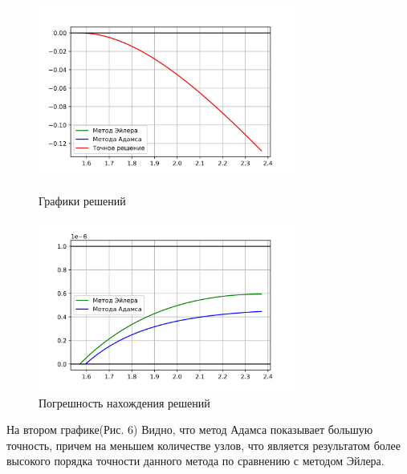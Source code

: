 \begin{figure}[h!]
	\centering                                                                                            
	\begin{minipage}{0.45\textwidth}
	        \centering
	        \includegraphics[width=8.5cm]{images/6.2_solution_plot.png} %
	        \caption{Графики решений}
	\end{minipage}\hfill
	\begin{minipage}{0.45\textwidth}
		\centering
		\includegraphics[width=8.5cm]{images/6.2_solution_err_plot.png} %
		\caption{Погрешность нахождения решений}
	\end{minipage}
\end{figure}

На втором графике(Рис. 6) Видно, что метод Адамса показывает большую точность, причем на меньшем количестве узлов, что является результатом более высокого порядка точности данного метода по сравнению с методом Эйлера.